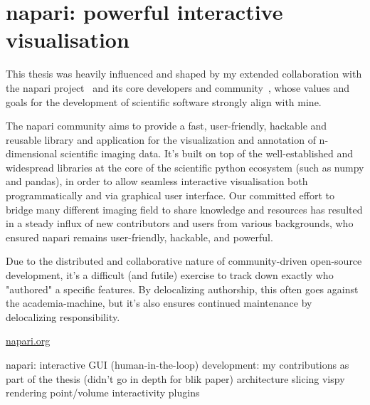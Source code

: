 \section{napari: powerful interactive visualisation}

This thesis was heavily influenced and shaped by my extended collaboration with the napari project~\cite{thenaparicommunityNapariMultidimensionalImage2024} and its core developers and community~\cite{thenaparicommunityCommunityNapari2024}, whose values and goals for the development of scientific software strongly align with mine.

The napari community aims to provide a fast, user-friendly, hackable and reusable library and application for the visualization and annotation of n-dimensional scientific imaging data.
It's built on top of the well-established and widespread libraries at the core of the scientific python ecosystem (such as numpy and pandas), in order to allow seamless interactive visualisation both programmatically and via graphical user interface.
Our committed effort to bridge many different imaging field to share knowledge and resources has resulted in a steady influx of new contributors and users from various backgrounds, who ensured napari remains user-friendly, hackable, and powerful.

Due to the distributed and collaborative nature of community-driven open-source development, it's a difficult (and futile) exercise to track down exactly who "authored" a specific features.
By delocalizing authorship, this often goes against the academia-machine, but it's also ensures continued maintenance by delocalizing responsibility.

\href{https://napari.org/}{napari.org}

\begin{outline}
\1 napari: interactive GUI (human-in-the-loop)
\1 development: my contributions as part of the thesis (didn't go in depth for blik paper)
    \2 architecture
    \2 slicing
    \2 vispy rendering
    \2 point/volume interactivity
    \2 plugins
\end{outline}
